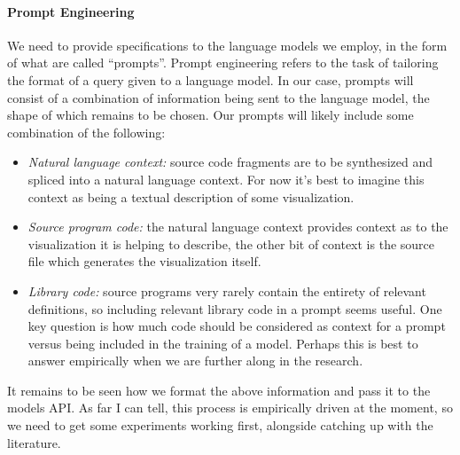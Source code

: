 \paragraph*{Prompt Engineering}
We need to provide specifications to the language models we employ, in the form of what are called
``prompts''. Prompt engineering refers to the task of tailoring the format of a query given to a 
language model. In our case, prompts will consist of a combination of information being sent to the
language model, the shape of which remains to be chosen.
Our prompts will likely include some combination of the following:
\begin{itemize}
   \item \textit{Natural language context:} source code fragments are to be synthesized and spliced into a natural language context. For now it's best to imagine this context as being a textual description of some visualization.
   \item \textit{Source program code:} the natural language context provides context as to the visualization it is helping to describe, the other bit of context is the source file which generates the visualization itself.
   \item \textit{Library code:} source programs very rarely contain the entirety of relevant definitions, so including relevant library code in a prompt seems useful. One key question is how much code should be considered as context for a prompt versus being included in the training of a model. Perhaps this is best to answer empirically when we are further along in the research.
\end{itemize}

It remains to be seen how we format the above information and pass it to the models API.
As far I can tell, this process is empirically driven at the moment, so we need
to get some experiments working first, alongside catching up with the literature.